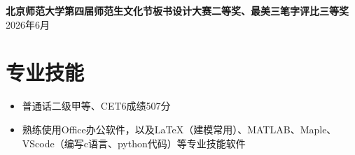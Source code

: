 		
		\textbf{北京师范大学第四届师范生文化节\textbf{板书设计大赛二等奖}、\textbf{最美三笔字评比三等奖}}\hfill 2026年6月

	\vspace*{-8pt}
	\section{\makebox[\widthof{\faGraduationCap}][c]{\color{WHU_Blue}{\faWrench}}\quad 专业技能}
	\begin{itemize}
		\item 普通话二级甲等、CET6成绩507分
		\item 熟练使用Office办公软件，以及LaTeX（建模常用）、MATLAB、Maple、VScode（编写c语言、python代码）等专业技能软件
	\end{itemize}
	
